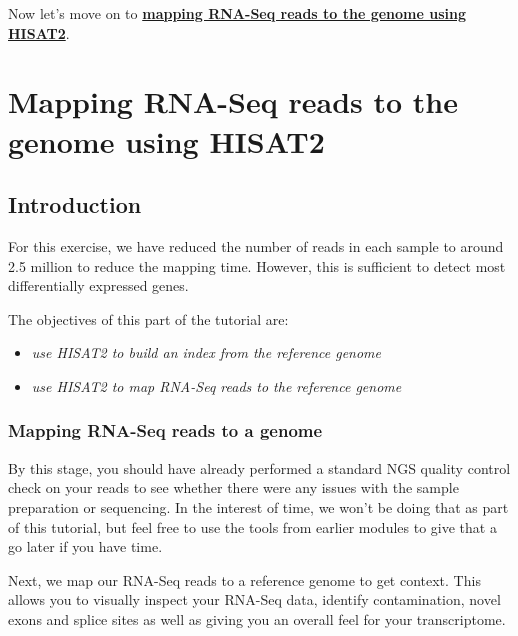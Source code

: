 \documentclass[11pt]{article}
\providecommand{\tightlist}{%
      \setlength{\itemsep}{0pt}\setlength{\parskip}{0pt}}
\begin{document}
Now let's move on to \textbf{\href{genome-mapping.ipynb}{mapping RNA-Seq reads to the genome
using HISAT2}}.





\newpage





    \hypertarget{mapping-rna-seq-reads-to-the-genome-using-hisat2}{%
\section{Mapping RNA-Seq reads to the genome using
HISAT2}\label{mapping-rna-seq-reads-to-the-genome-using-hisat2}}

    \hypertarget{introduction}{%
\subsection{Introduction}\label{introduction}}

For this exercise, we have reduced the number of reads in each sample to
around 2.5 million to reduce the mapping time. However, this is
sufficient to detect most differentially expressed genes.

The objectives of this part of the tutorial are:

\begin{itemize}
\tightlist
\item
  \textit{use HISAT2 to build an index from the reference genome}
\item
  \textit{use HISAT2 to map RNA-Seq reads to the reference genome}
\end{itemize}

    \hypertarget{mapping-rna-seq-reads-to-a-genome}{%
\subsubsection{Mapping RNA-Seq reads to a
genome}\label{mapping-rna-seq-reads-to-a-genome}}

By this stage, you should have already performed a standard NGS quality
control check on your reads to see whether there were any issues with
the sample preparation or sequencing. In the interest of time, we won't
be doing that as part of this tutorial, but feel free to use the tools
from earlier modules to give that a go later if you have time.

Next, we map our RNA-Seq reads to a reference genome to get context.
This allows you to visually inspect your RNA-Seq data, identify
contamination, novel exons and splice sites as well as giving you an
overall feel for your transcriptome.
\end{document}
